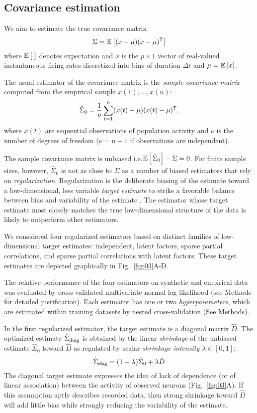 
\subsection*{Covariance estimation}
We aim to estimate the true covariance matrix 
\begin{equation}
\Sigma = \mathbb E_{}\left[ (x-\mu)(x-\mu)^{\sf T}\right]
\end{equation}
where $\mathbb E_{}\left[ \cdot\right]$ denotes expectation  and $x$ is the $p\times 1$ vector of real-valued instantaneous firing rates discretized into bins of duration $\Delta t$ and $\mu = \mathbb E_{}\left[ x\right]$.  

The usual estimator of the covariance matrix is the \emph{sample covariance matrix} computed from the empirical sample  $x(1),\ldots,x(n)$:
\begin{equation}
\hat \Sigma_0 = \frac 1 \nu \sum\limits_{t=1}^n (x(t)-\mu)(x(t)-\mu)^{\sf T}, 
\end{equation}
where $x(t)$ are sequential observations of population activity and $\nu$ is the number of degrees of freedom ($\nu=n-1$ if observations are independent).

The sample covariance matrix is unbiased i.e.\;$\mathbb E_{}\left[ \hat\Sigma_0\right]-\Sigma=0$.  For finite sample sizes, however, $\hat\Sigma_0$ is not as close to $\Sigma$ as a number of biased estimators that rely on \emph{regularization}. Regularization is the deliberate biasing of the estimate toward a low-dimensional, less variable \emph{target estimate} to strike a favorable balance between bias and variability of the estimate \cite{Bickel:2006,Ledoit:2004}.  The estimator whose target estimate most closely matches the true low-dimensional structure of the data is likely to outperform other estimators.

We considered four regularized estimators based on distinct families of low-dimensional target estimates: independent, latent factors, sparse partial correlations, and sparse partial correlations with latent factors. These target estimates are depicted graphically in Fig.~\ref{fig:03}A-D.  

The relative performance of the four estimators on synthetic and empirical data was evaluated by cross-validated multivariate normal log-likelihood (see Methods for detailed justification).  
Each estimator has one or two \emph{hyperparameters}, which are estimated within training datasets by nested cross-validation (See Methods). 

In the first regularized estimator, the target estimate is a diagonal matrix $\hat D$.  The optimized estimate $\hat\Sigma_{\rm diag}$ is obtained by the linear \emph{shrinkage} of the unbiased estimate $\hat\Sigma_0$ toward $\hat D$ as regulated by scalar \emph{shrinkage intensity} $\lambda \in [0, 1]$:
\begin{equation}
\hat \Sigma_{\sf diag} = (1-\lambda) \hat \Sigma_0 + \lambda \hat D
\end{equation}
The diagonal target estimate expresses the idea of lack of dependence (or of linear association) between the activity of observed neurons (Fig.~\ref{fig:03}A).  If this assumption aptly describes recorded data, then strong shrinkage toward $\hat D$ will add little bias while strongly reducing the variability of the estimate. 

